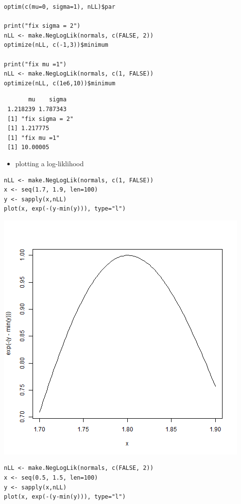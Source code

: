\documentclass[11pt]{article}
\begin{document}
\begin{verbatim}
optim(c(mu=0, sigma=1), nLL)$par

print("fix sigma = 2")
nLL <- make.NegLogLik(normals, c(FALSE, 2))
optimize(nLL, c(-1,3))$minimum

print("fix mu =1")
nLL <- make.NegLogLik(normals, c(1, FALSE))
optimize(nLL, c(1e6,10))$minimum
\end{verbatim}

\begin{verbatim}
       mu    sigma 
 1.218239 1.787343
 [1] "fix sigma = 2"
 [1] 1.217775
 [1] "fix mu =1"
 [1] 10.00005
\end{verbatim}


\begin{itemize}
\item plotting a log-liklihood
\end{itemize}

\begin{verbatim}
nLL <- make.NegLogLik(normals, c(1, FALSE))
x <- seq(1.7, 1.9, len=100)
y <- sapply(x,nLL)
plot(x, exp(-(y-min(y))), type="l")
\end{verbatim}

\includegraphics[width=.9\linewidth]{LL2.png}


\begin{verbatim}
nLL <- make.NegLogLik(normals, c(FALSE, 2))
x <- seq(0.5, 1.5, len=100)
y <- sapply(x,nLL)
plot(x, exp(-(y-min(y))), type="l")
\end{verbatim}
\end{document}
